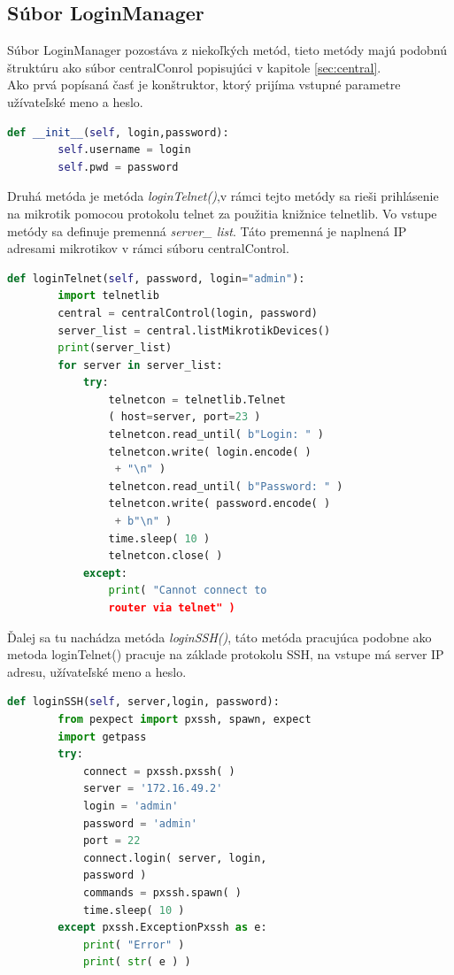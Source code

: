 \subsection{Súbor LoginManager}
Súbor LoginManager pozostáva z niekoľkých metód, tieto metódy majú podobnú štruktúru ako súbor centralConrol popisujúci v kapitole \ref{sec:central}.\\
Ako prvá popísaná časť je konštruktor, ktorý prijíma vstupné parametre užívateľské meno a heslo.
\begin{lstlisting}[language=python, frame=single, caption=Konštruktor súboru,captionpos=b, showstringspaces=false, basicstyle=\footnotesize] 
def __init__(self, login,password):
        self.username = login
        self.pwd = password
\end{lstlisting}
Druhá metóda je metóda \textit{loginTelnet()},v rámci tejto metódy sa rieši prihlásenie na mikrotik pomocou protokolu telnet za použitia knižnice telnetlib. Vo vstupe metódy sa definuje premenná \textit{server\_ list}. Táto premenná je naplnená IP adresami mikrotikov v rámci súboru centralControl.
\begin{lstlisting}[language=python, frame=single, caption=Metóda loginTelnet,captionpos=b, showstringspaces=false, basicstyle=\footnotesize] 
def loginTelnet(self, password, login="admin"):
        import telnetlib
        central = centralControl(login, password)
        server_list = central.listMikrotikDevices()
        print(server_list)
        for server in server_list:
            try:
                telnetcon = telnetlib.Telnet
                ( host=server, port=23 )
                telnetcon.read_until( b"Login: " )
                telnetcon.write( login.encode( )
                 + "\n" )
                telnetcon.read_until( b"Password: " )
                telnetcon.write( password.encode( )
                 + b"\n" )
                time.sleep( 10 )
                telnetcon.close( )
            except:
                print( "Cannot connect to 
                router via telnet" )
\end{lstlisting}
\newpage
Ďalej sa tu nachádza metóda \textit{loginSSH()}, táto metóda pracujúca podobne ako metoda loginTelnet() pracuje na základe protokolu SSH, na vstupe má server IP adresu, užívateľské meno  a heslo.
\begin{lstlisting}[language=python, frame=single, caption=Metóda loginSSH,captionpos=b, showstringspaces=false, basicstyle=\footnotesize] 
def loginSSH(self, server,login, password):
        from pexpect import pxssh, spawn, expect
        import getpass
        try:
            connect = pxssh.pxssh( )
            server = '172.16.49.2'
            login = 'admin'
            password = 'admin'
            port = 22
            connect.login( server, login, 
            password )
            commands = pxssh.spawn( )
            time.sleep( 10 )
        except pxssh.ExceptionPxssh as e:
            print( "Error" )
            print( str( e ) )
\end{lstlisting}
